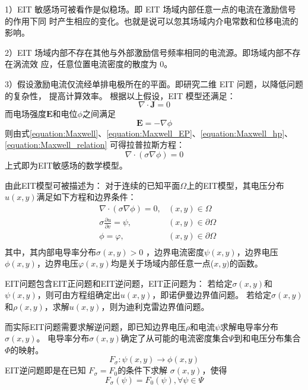 1）EIT 敏感场可被看作是似稳场。即 EIT 场域内部任意一点的电流在激励信号的作用下同
  时产生相应的变化。也就是说可以忽其场域内介电常数和位移电流的影响。

2）EIT 场域内部不存在其他与外部激励信号频率相同的电流源。即场域内部不存在涡流效
  应，任意位置电流密度的散度为 0。

3）假设激励电流仅流经单排电极所在的平面。即研究二维 EIT 问题，以降低问题的复杂性，
  提高计算效率。
根据以上假设，EIT 模型还满足：
\begin{equation}
  \label{equation:Maxwell_hp}
  \nabla \cdot \boldsymbol{J} = 0
\end{equation}
而电场强度$\boldsymbol{E}$和电位$\phi$之间满足
\begin{equation}
  \label{equation:Maxwell_EP}
  \boldsymbol{E} = - \nabla \phi
\end{equation}
则由式\cref{equation:Maxwell}、\cref{equation:Maxwell_EP}、\cref{equation:Maxwell_hp}、\cref{equation:Maxwell_relation}
可得拉普拉斯方程：
\begin{equation}
  \nabla \cdot (\sigma\nabla\phi) = 0
\end{equation}
上式即为EIT敏感场的数学模型。

由此EIT模型可被描述为：
对于连续的已知平面$\Omega$上的EIT模型，其电压分布$u(x,y)$满足如下方程和边界条件：
\begin{equation}
  \begin{aligned}
  &\nabla \cdot (\sigma \nabla \phi) = 0, &(x, y)\in {\Omega} \\
  &\sigma\frac{\partial{u}}{\partial{v}} = \psi, &(x,y) \in {\partial{\Omega}} \\
  &\phi = \varphi, &(x,y)\in\partial{\Omega} \\
\end{aligned}
\end{equation}
其中，其内部电导率分布$\sigma(x,y) > 0$ ，边界电流密度$\psi(x,y)$，边界电压$\phi(x,y)$，边界电压$\varphi(x,y)$均是关于场域内部任意一点($x,y)$的函数。

EIT问题包含EIT正问题和EIT逆问题，EIT正问题为：
若给定$\sigma(x,y)$和$\psi(x,y)$，则可由方程组确定出$u(x,y)$，即诺伊曼边界值问题。
若给定$\sigma(x,y)$和$\rho(x,y)$，求解$u(x,y)$，则为迪利克雷边界值问题。

而实际EIT问题需要求解逆问题，即已知边界电压$\rho$和电流$\psi$求解电导率分布$\sigma(x,y)$。
电导率分布$\sigma(x,y)$确定了从可能的电流密度集合$\Psi$到和电压分布集合$\Phi$的映射。
\begin{equation}
  F_\sigma: \psi(x,y) \rightarrow \phi(x,y)
\end{equation}
EIT逆问题即是在已知 $F_{\sigma} = F_0$的条件下求解 $\sigma(x,y)$，使得
\begin{equation}
  F_{\sigma}(\psi) = F_{0}(\psi),  \forall \psi \in \Psi
\end{equation}


